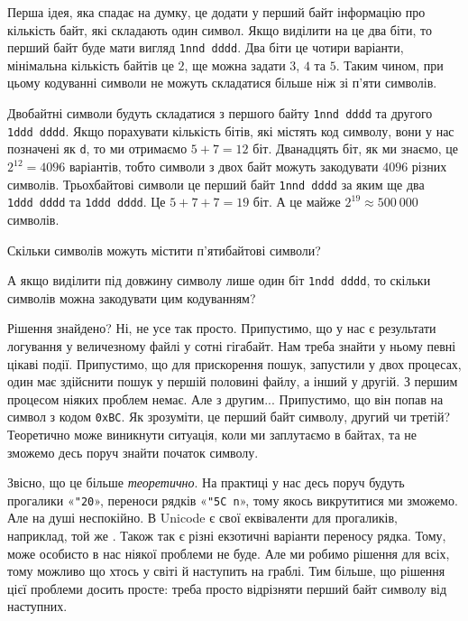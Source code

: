 \documentclass{book}
\newcommand{\bitstr}[1]{{\tt #1}}
\newcommand{\hexstr}[1]{{\tt 0x#1}}
\newcommand{\escape}[1]{\texttt{\char"5C #1}}
\newcommand{\chr}[1]{«\texttt{#1}»}
\newcommand{\s}{\char"20}
\newcommand{\chesc}[1]{\chr{\escape{#1}}}
\begin{document}
Перша ідея, яка спадає на думку, це додати у перший байт інформацію про кількість байт, які складають один символ.
Якщо виділити на це два біти, то перший байт буде мати вигляд \bitstr{1nnd~dddd}.
Два біти це чотири варіанти, мінімальна кількість байтів це $2$, ще можна задати $3$, $4$ та $5$.
Таким чином, при цьому кодуванні символи не можуть складатися більше ніж зі п'яти символів.

Двобайтні символи будуть складатися з першого байту \bitstr{1nnd~dddd} та другого \bitstr{1ddd~dddd}.
Якщо порахувати кількість бітів, які містять код символу, вони у нас позначені як \bitstr{d}, то ми отримаємо $5+7=12$ біт.
Дванадцять біт, як ми знаємо, це $2^{12}=4096$ варіантів, тобто символи з двох байт можуть закодувати $4096$ різних символів.
Трьохбайтові символи це перший байт \bitstr{1nnd~dddd} за яким ще два \bitstr{1ddd~dddd} та \bitstr{1ddd~dddd}.
Це $5+7+7=19$ біт.
А це майже $2^{19} \approx 500~000$ символів.

\begin{exercise}
Скільки символів можуть містити п'ятибайтові символи?
\end{exercise}

\begin{exercise}
А якщо виділити під довжину символу лише один біт \bitstr{1ndd~dddd}, то скільки символів можна закодувати цим кодуванням?
\end{exercise}

Рішення знайдено? Ні, не усе так просто.
Припустимо, що у нас є результати логування у величезному файлі у сотні гігабайт.
Нам треба знайти у ньому певні цікаві події.
Припустимо, що для прискорення пошук, запустили у двох процесах, один має здійснити пошук у першій половині файлу, а інший у другій.
З першим процесом ніяких проблем немає.
Але з другим...
Припустимо, що він попав на символ з кодом \hexstr{BC}.
Як зрозуміти, це перший байт символу, другий чи третій?
Теоретично може виникнути ситуація, коли ми заплутаємо в байтах, та не зможемо десь поруч знайти початок символу.

Звісно, що це більше \textit{теоретично}.
На практиці у нас десь поруч будуть прогалики \chr{\s}, переноси рядків \chesc n, тому якось викрутитися ми зможемо.
Але на душі неспокійно.
В Unicode є свої еквіваленти для прогаликів, наприклад, той же .
Також так є різні екзотичні варіанти переносу рядка.
Тому, може особисто в нас ніякої проблеми не буде.
Але ми робимо рішення для всіх, тому можливо що хтось у світі й наступить на граблі.
Тим більше, що рішення цієї проблеми досить просте: треба просто відрізняти перший байт символу від наступних.
\end{document}
